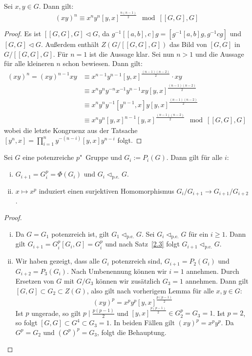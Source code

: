 \documentclass[11pt,a4paper,openany]{memoir}
\begin{document}
\begin{lemma}
Sei $x,y\in G$. Dann gilt: 
\[(xy)^n\equiv x^ny^n[y,x]^{\frac{n(n-1)}{2}}\mod [[G,G],G] \]
\end{lemma}

\begin{proof}
Es ist $[[G,G],G]\lhd G$, da $g^{-1}[[a,b],c]g=[g^{-1}[a,b]g,g^{-1}cg]$ und $[G,G]\lhd G$. Außerdem enthält $Z(G/[[G,G],G])$ das Bild von $[G,G]$ in $G/[[G,G],G]$. Für $n=1$ ist die Aussage klar. Sei nun $n>1$ und die Aussage für alle kleineren $n$ schon bewiesen. Dann gilt:
\begin{align*}
(xy)^n = (xy)^{n-1}xy &\equiv x^{n-1}y^{n-1}[y,x]^{\frac{(n-1)(n-2)}{2}}\cdot xy\\
&\equiv x^ny^n y^{-n}x^{-1}y^{n-1}xy [y,x]^\frac{(n-1)(n-2)}{2}\\
&\equiv x^ny^ny^{-1}[y^{n-1},x] y[y,x]^\frac{(n-1)(n-2)}{2}\\
&\equiv x^ny^n[y,x]^{n-1}[y,x]^\frac{(n-1)(n-2)}{2}\mod [[G,G],G]
\end{align*}
wobei die letzte Kongruenz aus der Tatsache $[y^n,x]=\prod_{i=1}^n y^{-(n-i)}[y,x]y^{n-i}$ folgt.
\end{proof}

\begin{proposition}\label{2.4}
Sei $G$ eine potenzreiche $p$"~Gruppe und $G_i:=P_i(G)$. Dann gilt für alle $i$:
\begin{enumerate}[(i)]
\item $G_{i+1}=G_i^p=\Phi(G_i)$ und $G_i\lhd_\text{p.e.} G$.
\item $x\mapsto x^p$ induziert einen surjektiven Homomorphismus $G_i/G_{i+1}\to G_{i+1}/G_{i+2}$.
\end{enumerate}
\end{proposition}

\begin{proof}
\begin{enumerate}[(i)]
\item Da $G=G_1$ potenzreich ist, gilt $G_1\lhd_\text{p.e.}G$. Sei $G_i\lhd_\text{p.e.}G$ für ein $i\geq 1$. Dann gilt $G_{i+1}=G_i^p[G_i,G]=G_i^p$ und nach Satz~\ref{2.3} folgt $G_{i+1}\lhd_\text{p.e.}G$.
\item Wir haben gezeigt, dass alle $G_i$ potenzreich sind, $G_{i+1}=P_2(G_i)$ und $G_{i+2}=P_3(G_i)$. Nach Umbenennung können wir $i=1$ annehmen. Durch Ersetzen von $G$ mit $G/G_3$ können wir zusätzlich $G_3=1$ annehmen. Dann gilt $[G,G]\subset G_2\subset Z(G)$, also gilt nach vorherigem Lemma für alle $x,y\in G$:
\[(xy)^p=x^py^p[y,x]^{\frac{p(p-1)}{2}} \]
Ist $p$ ungerade, so gilt $p\mid \frac{p(p-1)}{2}$ und $[y,x]^\frac{p(p-1)}{2}\in G_2^p=G_3=1$. Ist $p=2$, so folgt $[G,G]\subset G^4\subset G_3=1$. In beiden Fällen gilt $(xy)^p=x^py^p$. Da $G^p=G_2$ und $(G^p)^p=G_3$, folgt die Behauptung.\qedhere
\end{enumerate}
\end{proof}
\end{document}

